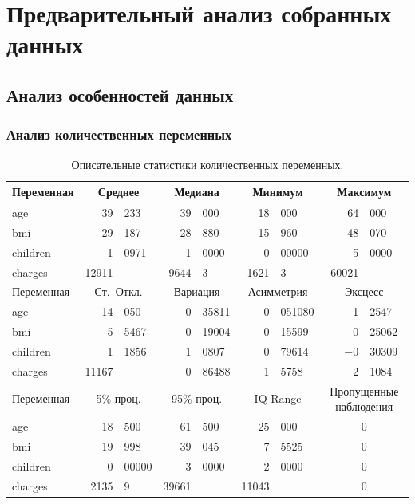 \documentclass[a4paper,12pt]{article}
\begin{document}
\section{Предварительный анализ собранных данных}
\subsection{Анализ особенностей данных}
\subsubsection{Анализ количественных переменных}

\begin{table}[H]
	\begin{center}
		\begin{tabular}{|lr@{,}lr@{,}lr@{,}lr@{,}l|}
			\hline
			Переменная & \multicolumn{2}{c}{Среднее}
			& \multicolumn{2}{c}{Медиана}
			& \multicolumn{2}{c}{Минимум}
			& \multicolumn{2}{c|}{Максимум} \\[1ex]
			\hline
			age & 39&233 & 39&000 & 18&000 & 64&000\\
			bmi & 29&187 & 28&880 & 15&960 & 48&070\\
			children & 1&0971 & 1&0000 & 0&00000 & 5&0000\\
			charges & 12911& & 9644&3 & 1621&3 & 60021&\\[10pt]
			
			\hline
			Переменная &  \multicolumn{2}{c}{Ст.\ Откл.}
			& \multicolumn{2}{c}{Вариация}
			& \multicolumn{2}{c}{Асимметрия}
			& \multicolumn{2}{c|}{Эксцесс} \\[1ex]
			\hline
			age & 14&050 & 0&35811 & 0&051080 & $-$1&2547\\
			bmi & 5&5467 & 0&19004 & 0&15599 & $-$0&25062\\
			children & 1&1856 & 1&0807 & 0&79614 & $-$0&30309\\
			charges & 11167& & 0&86488 & 1&5758 & 2&1084\\[10pt]
			
			\hline
			Переменная &  \multicolumn{2}{c}{5\% проц.}
			& \multicolumn{2}{c}{95\% проц.}
			& \multicolumn{2}{c}{IQ Range}
			& \multicolumn{2}{c|}{Пропущенные наблюдения} \\[1ex]
			\hline
			age & 18&500 & 61&500 & 25&000 & \multicolumn{2}{c|}{0}\\
			bmi & 19&998 & 39&045 & 7&5525 & \multicolumn{2}{c|}{0}\\
			children & 0&00000 & 3&0000 & 2&0000 & \multicolumn{2}{c|}{0}\\
			charges & 2135&9 & 39661& & 11043& & \multicolumn{2}{c|}{0}\\
			\hline
		\end{tabular}
	\end{center}
	\caption{Описательные статистики количественных переменных.}
	\label{tab:table2}
\end{table}
\end{document}
